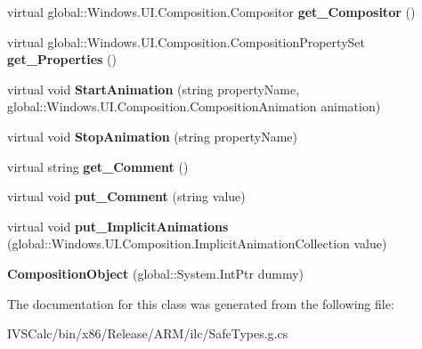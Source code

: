 \begin{DoxyCompactItemize}
virtual global\+::\+Windows.\+U\+I.\+Composition.\+Compositor {\bfseries get\+\_\+\+Compositor} ()
\item 
\mbox{\label{class_windows_1_1_u_i_1_1_composition_1_1_composition_object_a365892d3180752a586915b7673ffda82}} 
virtual global\+::\+Windows.\+U\+I.\+Composition.\+Composition\+Property\+Set {\bfseries get\+\_\+\+Properties} ()
\item 
\mbox{\label{class_windows_1_1_u_i_1_1_composition_1_1_composition_object_af5a951dd44f067e4376daa62bcd893a1}} 
virtual void {\bfseries Start\+Animation} (string property\+Name, global\+::\+Windows.\+U\+I.\+Composition.\+Composition\+Animation animation)
\item 
\mbox{\label{class_windows_1_1_u_i_1_1_composition_1_1_composition_object_a1cd6b40941abd315607a06f492a8bc8f}} 
virtual void {\bfseries Stop\+Animation} (string property\+Name)
\item 
\mbox{\label{class_windows_1_1_u_i_1_1_composition_1_1_composition_object_ae75723b4139b9231f070eeeff95eb764}} 
virtual string {\bfseries get\+\_\+\+Comment} ()
\item 
\mbox{\label{class_windows_1_1_u_i_1_1_composition_1_1_composition_object_a489899a008945284e6ce17e08c880cb7}} 
virtual void {\bfseries put\+\_\+\+Comment} (string value)
\item 
\mbox{\label{class_windows_1_1_u_i_1_1_composition_1_1_composition_object_ad8d4008a5c31ce42878ce448fe3e5598}} 
virtual void {\bfseries put\+\_\+\+Implicit\+Animations} (global\+::\+Windows.\+U\+I.\+Composition.\+Implicit\+Animation\+Collection value)
\item 
\mbox{\label{class_windows_1_1_u_i_1_1_composition_1_1_composition_object_a31b74b02386afece7eb73f6d8009fdea}} 
{\bfseries Composition\+Object} (global\+::\+System.\+Int\+Ptr dummy)
\end{DoxyCompactItemize}


The documentation for this class was generated from the following file\+:\begin{DoxyCompactItemize}
\item 
I\+V\+S\+Calc/bin/x86/\+Release/\+A\+R\+M/ilc/Safe\+Types.\+g.\+cs\end{DoxyCompactItemize}
